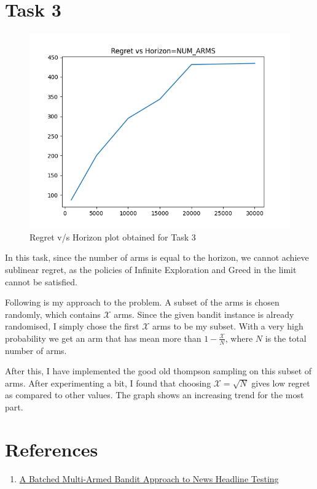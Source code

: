 \documentclass{article}
\begin{document}
\section{Task 3}
\begin{figure}[H]
    \centerline{\includegraphics[scale=0.75]{task3-20220910-060229.png}}
    \caption{Regret v/s Horizon plot obtained for Task 3}
\end{figure}
In this task, since the number of arms is equal to the horizon, we cannot achieve sublinear regret, as the policies of
Infinite Exploration and Greed in the limit cannot be satisfied.

Following is my approach to the problem. A subset of the arms is chosen randomly, which contains $\mathcal{X}$ arms. Since the given bandit instance is already randomised, I simply chose the 
first $\mathcal{X}$ arms to be my subset. 
With a very high probability we get an arm that has mean more than $1 - \frac{\mathcal{X}}{N}$, where $N$ is the total number of arms.

After this, I have implemented the good old thompson sampling on this subset of arms. After experimenting a bit, I found that choosing $\mathcal{X} = \sqrt{N}$ gives low regret as compared to other values.
The graph shows an increasing trend for the most part. 
\newpage
\thispagestyle{fancy}
\section{References}
\begin{enumerate}
    \item \href{https://arxiv.org/pdf/1908.06256.pdf}{A Batched Multi-Armed Bandit Approach to News Headline Testing}
\end{enumerate}
\end{document}
